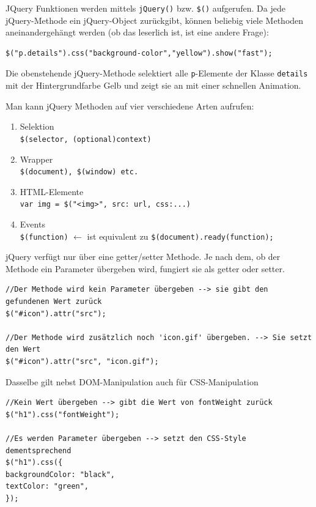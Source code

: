 \documentclass[a4paper, 11pt]{article}
\newcommand{\code}[1]{\texttt{#1}}
\begin{document}
\vspace{10px}

\noindent JQuery Funktionen werden mittels \code{jQuery()} bzw. \code{\$()} aufgerufen. Da jede jQuery-Methode ein jQuery-Object zurückgibt, können beliebig viele Methoden aneinandergehängt werden (ob das leserlich ist, ist eine andere Frage):

\begin{lstlisting}
$("p.details").css("background-color","yellow").show("fast");
\end{lstlisting}
Die obenstehende jQuery-Methode selektiert alle \code{p}-Elemente der Klasse \code{details} mit der Hintergrundfarbe Gelb und zeigt sie an mit einer schnellen Animation.

\vspace{10px}

\noindent Man kann jQuery Methoden auf vier verschiedene Arten aufrufen:
\begin{enumerate}
	\item Selektion \\
	\code{\$(selector, (optional)context)}
	\item Wrapper\\
	\code{\$(document), \$(window) etc.}
	\item HTML-Elemente\\
	\code{var img = \$("<img>", {src: url, css:{...}})}
	\item Events\\
	\code{\$(function)} $\leftarrow$ ist equivalent zu \code{\$(document).ready(function);}
\end{enumerate}

\vspace{10px}

\noindent jQuery verfügt nur über eine getter/setter Methode. Je nach dem, ob der Methode ein Parameter übergeben wird, fungiert sie als getter oder setter.

\begin{lstlisting}
//Der Methode wird kein Parameter übergeben --> sie gibt den gefundenen Wert zurück
$("#icon").attr("src");

//Der Methode wird zusätzlich noch 'icon.gif' übergeben. --> Sie setzt den Wert
$("#icon").attr("src", "icon.gif");
\end{lstlisting}

\noindent Dasselbe gilt nebst DOM-Manipulation auch für CSS-Manipulation
\begin{lstlisting}
//Kein Wert übergeben --> gibt die Wert von fontWeight zurück
$("h1").css("fontWeight");

//Es werden Parameter übergeben --> setzt den CSS-Style dementsprechend
$("h1").css({
backgroundColor: "black",
textColor: "green",
});
\end{lstlisting}
\end{document}
